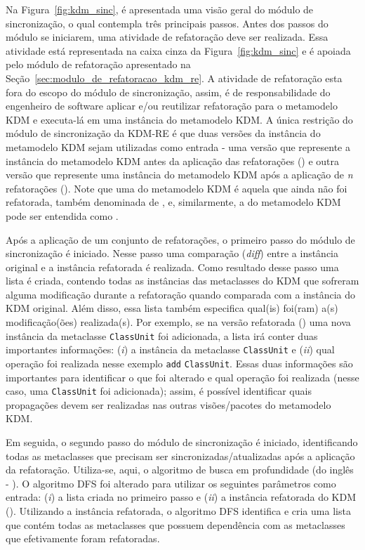 Na Figura~\ref{fig:kdm_sinc}, é apresentada uma visão geral do módulo de sincronização, o qual contempla três principais passos. Antes dos passos do módulo se iniciarem, uma atividade de refatoração deve ser realizada. Essa atividade está representada na caixa cinza da Figura~\ref{fig:kdm_sinc}  e é apoiada pelo módulo de refatoração apresentado na Seção~\ref{sec:modulo_de_refatoracao_kdm_re}. A atividade de refatoração esta fora do escopo do módulo de sincronização, assim, é de responsabilidade do engenheiro de software aplicar e/ou reutilizar refatoração para o metamodelo KDM e executa-lá em uma instância do metamodelo KDM. A única restrição do módulo de sincronização da KDM-RE é que duas versões da instância do metamodelo KDM sejam utilizadas como entrada - uma versão que represente a instância do metamodelo KDM antes da aplicação das refatorações () e outra versão que represente uma instância do metamodelo KDM após a aplicação de \textit{n} refatorações (). Note que uma  do metamodelo KDM é aquela que ainda não foi refatorada, também denominada de , e, similarmente, a  do metamodelo KDM pode ser entendida como . 

Após a aplicação de um conjunto de refatorações, o primeiro passo do módulo de sincronização é iniciado. Nesse passo uma comparação (\textit{diff}) entre a instância original e a instância refatorada é realizada. Como resultado desse passo uma lista é criada, contendo todas as instâncias das metaclasses do KDM que sofreram alguma modificação durante a refatoração quando comparada com a instância do KDM original. Além disso, essa lista também especifica qual(is) foi(ram) a(s) modificação(ões) realizada(s). Por exemplo, se na versão refatorada () uma nova instância da metaclasse \texttt{ClassUnit} foi adicionada, a lista irá conter duas importantes informações: (\textit{i}) a instância da metaclasse \texttt{ClassUnit} e (\textit{ii}) qual operação foi realizada nesse exemplo \texttt{add} \texttt{ClassUnit}. Essas duas informações são importantes para identificar o que foi alterado e qual operação foi realizada (nesse caso, uma \texttt{ClassUnit} foi adicionada); assim, é possível identificar quais propagações devem ser realizadas nas outras visões/pacotes do metamodelo KDM.

Em seguida, o segundo passo do módulo de sincronização é iniciado, identificando todas as metaclasses que precisam ser sincronizadas/atualizadas após a aplicação da refatoração. Utiliza-se, aqui, o algoritmo de busca em profundidade (do inglês - ). O algoritmo DFS foi alterado para utilizar os seguintes parâmetros como entrada: (\textit{i}) a lista criada no primeiro passo e (\textit{ii}) a instância refatorada do KDM (). Utilizando a instância refatorada, o algoritmo DFS identifica e cria uma lista que contém todas as metaclasses que possuem dependência com as metaclasses que efetivamente foram refatoradas.

